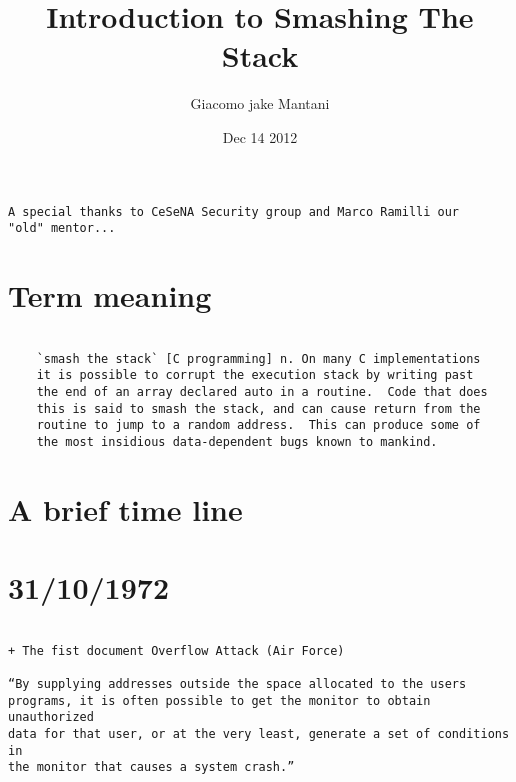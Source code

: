 
\author{Giacomo jake Mantani}
\title[Introduction to Smashing The Stack]{Introduction to Smashing The Stack}
\date{Dec 14 2012}

\begin{frame}
        \titlepage
      \end{frame}
\begin{frame}[fragile]
\begin{verbatim}
A special thanks to CeSeNA Security group and Marco Ramilli our
"old" mentor...
\end{verbatim}
\end{frame}
\section{Term meaning}
\begin{frame}[fragile]
\begin{verbatim}

    `smash the stack` [C programming] n. On many C implementations
    it is possible to corrupt the execution stack by writing past
    the end of an array declared auto in a routine.  Code that does
    this is said to smash the stack, and can cause return from the
    routine to jump to a random address.  This can produce some of
    the most insidious data-dependent bugs known to mankind.

\end{verbatim}
\end{frame}
\section{A brief time line}
\section{31/10/1972}
\begin{frame}[fragile]
\begin{verbatim}

+ The fist document Overflow Attack (Air Force)

“By supplying addresses outside the space allocated to the users
programs, it is often possible to get the monitor to obtain unauthorized
data for that user, or at the very least, generate a set of conditions in
the monitor that causes a system crash.”

\end{verbatim}
\end{frame}
